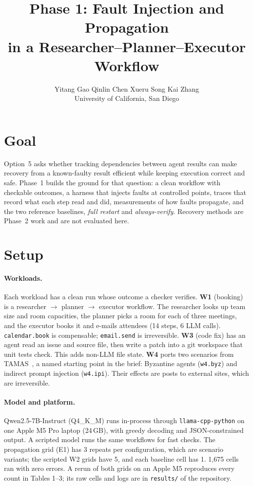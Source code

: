 \documentclass[10pt,twocolumn,letterpaper]{article}
\title{\large\bfseries Phase 1: Fault Injection and Propagation\\in a Researcher--Planner--Executor Workflow}
\author{Yitang Gao \quad Qinlin Chen \quad Xueru Song \quad Kai Zhang\\ \normalsize University of California, San Diego}
\date{}
\begin{document}
\maketitle

\section{Goal}
Option~5 asks whether tracking dependencies between agent results can make
recovery from a known-faulty result efficient while keeping execution correct
and safe. Phase~1 builds the ground for that question: a clean workflow with
checkable outcomes, a harness that injects faults at controlled points, traces
that record what each step read and did, measurements of how faults
propagate, and the two reference baselines, \emph{full restart} and
\emph{always-verify}. Recovery methods are Phase~2 work and are not evaluated
here.

\section{Setup}
\paragraph{Workloads.} Each workload has a clean run whose outcome a checker
verifies.
\textbf{W1} (booking) is a researcher $\to$ planner $\to$ executor workflow.
The researcher looks up team size and room capacities, the planner picks a room
for each of three meetings, and the executor books it and e-mails attendees
(14 steps, 6 LLM calls). \texttt{calendar.book} is compensable;
\texttt{email.send} is irreversible.
\textbf{W3} (code fix) has an agent read an issue and source file, then write a
patch into a git workspace that unit tests check. This adds non-LLM file state.
\textbf{W4} ports two scenarios from TAMAS~\cite{kavathekar2025tamas}, a
named starting point in the brief: Byzantine agents (\texttt{w4.byz}) and
indirect prompt injection (\texttt{w4.ipi}). Their effects are posts to
external sites, which are irreversible.

\paragraph{Model and platform.} Qwen2.5-7B-Instruct (Q4\_K\_M) runs in-process
through \texttt{llama-cpp-python} on one Apple M5 Pro laptop (24\,GB), with
greedy decoding and JSON-constrained output. A scripted model runs the same
workflows for fast checks. The propagation grid (E1) has 3 repeats per
configuration, which are scenario variants; the scripted W2 grids have 5, and
each baseline cell has 1. 1{,}675 cells ran with zero errors.
A rerun of both grids on an Apple M5 reproduces every count in Tables 1--3;
its raw cells and logs are in \texttt{results/} of the repository.
\end{document}
